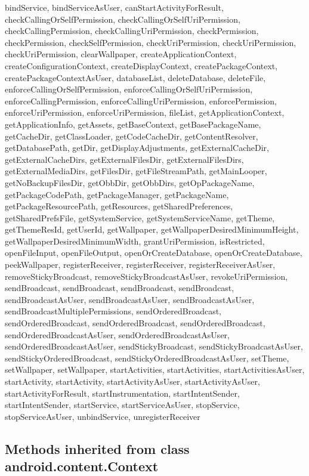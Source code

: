 bindService, bindServiceAsUser, canStartActivityForResult, checkCallingOrSelfPermission, checkCallingOrSelfUriPermission, checkCallingPermission, checkCallingUriPermission, checkPermission, checkPermission, checkSelfPermission, checkUriPermission, checkUriPermission, checkUriPermission, clearWallpaper, createApplicationContext, createConfigurationContext, createDisplayContext, createPackageContext, createPackageContextAsUser, databaseList, deleteDatabase, deleteFile, enforceCallingOrSelfPermission, enforceCallingOrSelfUriPermission, enforceCallingPermission, enforceCallingUriPermission, enforcePermission, enforceUriPermission, enforceUriPermission, fileList, getApplicationContext, getApplicationInfo, getAssets, getBaseContext, getBasePackageName, getCacheDir, getClassLoader, getCodeCacheDir, getContentResolver, getDatabasePath, getDir, getDisplayAdjustments, getExternalCacheDir, getExternalCacheDirs, getExternalFilesDir, getExternalFilesDirs, getExternalMediaDirs, getFilesDir, getFileStreamPath, getMainLooper, getNoBackupFilesDir, getObbDir, getObbDirs, getOpPackageName, getPackageCodePath, getPackageManager, getPackageName, getPackageResourcePath, getResources, getSharedPreferences, getSharedPrefsFile, getSystemService, getSystemServiceName, getTheme, getThemeResId, getUserId, getWallpaper, getWallpaperDesiredMinimumHeight, getWallpaperDesiredMinimumWidth, grantUriPermission, isRestricted, openFileInput, openFileOutput, openOrCreateDatabase, openOrCreateDatabase, peekWallpaper, registerReceiver, registerReceiver, registerReceiverAsUser, removeStickyBroadcast, removeStickyBroadcastAsUser, revokeUriPermission, sendBroadcast, sendBroadcast, sendBroadcast, sendBroadcast, sendBroadcastAsUser, sendBroadcastAsUser, sendBroadcastAsUser, sendBroadcastMultiplePermissions, sendOrderedBroadcast, sendOrderedBroadcast, sendOrderedBroadcast, sendOrderedBroadcast, sendOrderedBroadcastAsUser, sendOrderedBroadcastAsUser, sendOrderedBroadcastAsUser, sendStickyBroadcast, sendStickyBroadcastAsUser, sendStickyOrderedBroadcast, sendStickyOrderedBroadcastAsUser, setTheme, setWallpaper, setWallpaper, startActivities, startActivities, startActivitiesAsUser, startActivity, startActivity, startActivityAsUser, startActivityAsUser, startActivityForResult, startInstrumentation, startIntentSender, startIntentSender, startService, startServiceAsUser, stopService, stopServiceAsUser, unbindService, unregisterReceiver\\

\subsection{Methods inherited from class android.content.Context}

